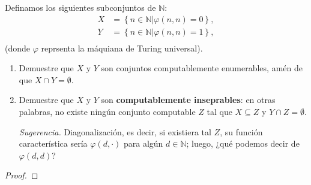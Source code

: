 \documentclass[12pt]{report}
\newcounter{it}
\theoremstyle{largebreak}
\begin{document}
    \begin{excer}
        Definamos los siguientes subconjuntos de $\mathbb{N}$:
        \begin{equation*}
            \begin{split}
                X&=\left\{n\in\mathbb{N}\Big|\varphi(n,n)=0 \right\},\\
                Y&=\left\{n\in\mathbb{N}\Big|\varphi(n,n)=1 \right\},\\
            \end{split}
        \end{equation*}
        (donde $\varphi$ reprsenta la máquiana de Turing universal).
        \begin{enumerate}[label = \textit{(\alph*)}]
            \item Demuestre que $X$ y $Y$ son conjuntos computablemente enumerables, amén de que $X\cap Y=\emptyset$.
            \item Demuestre que $X$ y $Y$ son \textbf{computablemente inseprables}: en otras palabras, no existe ningún conjunto computable $Z$ tal que $X\subseteq Z$ y $Y\cap Z=\emptyset$. 
            
            \textit{Sugerencia.} Diagonalización, es decir, si existiera tal $Z$, su función característica sería $\varphi(d,\cdot)$ para algún $d\in\mathbb{N}$; luego, ¿qué podemos decir de $\varphi(d,d)$?
        \end{enumerate}
    \end{excer}

    \begin{proof}
        
    \end{proof}
\end{document}
